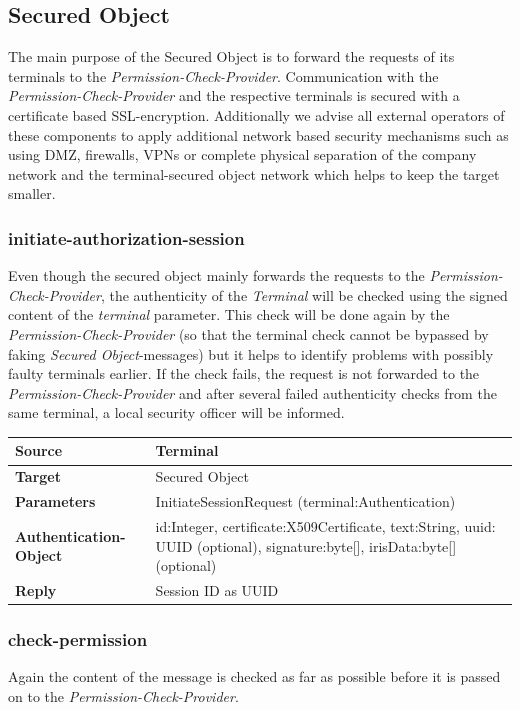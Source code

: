\documentclass[12pt,a4paper,titlepage,oneside]{scrartcl}
\begin{document}
\subsection{Secured Object}
The main purpose of the Secured Object is to forward the requests of its terminals to the \emph{Permission-Check-Provider}. Communication with the \emph{Permission-Check-Provider} and the respective terminals is secured with a certificate based SSL-encryption. Additionally we advise all external operators of these components to apply additional network based security mechanisms such as using DMZ, firewalls, VPNs or complete physical separation of the company network and the terminal-secured object network which helps to keep the target smaller.

\subsubsection{initiate-authorization-session}
Even though the secured object mainly forwards the requests to the \emph{Permission-Check-Provider}, the authenticity of the \emph{Terminal} will be checked using the signed content of the \emph{terminal} parameter. This check will be done again by the \emph{Permission-Check-Provider} (so that the terminal check cannot be bypassed by faking \emph{Secured Object}-messages) but it helps to identify problems with possibly faulty terminals earlier. If the check fails, the request is not forwarded to the \emph{Permission-Check-Provider} and after several failed authenticity checks from the same terminal, a local security officer will be informed.

\begin{table}[h]
    \centering
    \begin{tabular}{|l|p{12cm}|} \hline
    \textbf{Source}&Terminal\\ \hline
    \textbf{Target}&Secured Object\\ \hline
    \textbf{Parameters}&InitiateSessionRequest (terminal:Authentication)\\ \hline
    \textbf{Authentication-Object}&id:Integer, certificate:X509Certificate, text:String, uuid: UUID (optional), signature:byte[], irisData:byte[] (optional)\\ \hline
    \textbf{Reply}&Session ID as UUID\\ \hline
    \end{tabular}
\end{table}

\subsubsection{check-permission}
Again the content of the message is checked as far as possible before it is passed on to the \emph{Permission-Check-Provider}.
\end{document}
